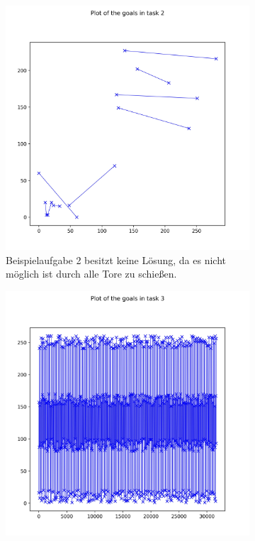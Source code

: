 \begin{figure}
\label{fig:beispiele2}
\vspace{-0.5cm}
\centering
     \begin{subfigure}[b]{0.49\textwidth}
         \centering
         \includegraphics[width=\textwidth]{images/task_2.jpeg}
         \caption{Beispielaufgabe 2 besitzt keine Lösung, da es nicht möglich ist durch alle Tore zu schießen.}
         \label{fig:five over x}
     \end{subfigure}
     \hfill
     \begin{subfigure}[b]{0.49\textwidth}
         \centering
         \includegraphics[width=\textwidth]{images/task_3.jpeg}

\end{subfigure}
\end{figure}
